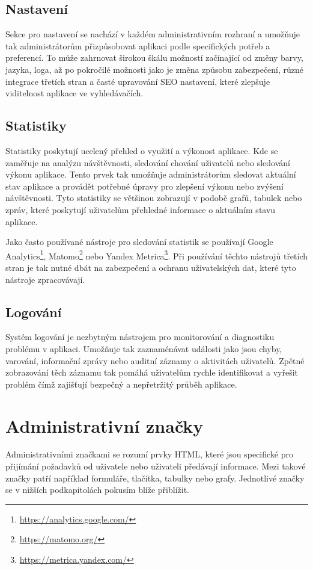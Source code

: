 \subsection{Nastavení}
\label{subsec:admin-elements-settings}
Sekce pro nastavení se nachází v každém administrativním rozhraní a umožňuje tak administrátorům přizpůsobovat aplikaci podle specifických potřeb a preferencí. To může zahrnovat širokou škálu možností začínající od změny barvy, jazyka, loga, až po pokročilé možnosti jako je změna způsobu zabezpečení, různé integrace třetích stran a časté upravování SEO nastavení, které zlepšuje viditelnost aplikace ve vyhledávačích.

\subsection{Statistiky}
\label{subsec:admin-elements-statistics}
Statistiky poskytují ucelený přehled o využití a výkonost aplikace. Kde se zaměřuje na analýzu návštěvnosti, sledování chování uživatelů nebo sledování výkonu aplikace. Tento prvek tak umožňuje administrátorům sledovat aktuální stav aplikace a provádět potřebné úpravy pro zlepšení výkonu nebo zvýšení návštěvnosti.
Tyto statistiky se většinou zobrazují v podobě grafů, tabulek nebo zpráv, které poskytují uživatelům přehledné informace o aktuálním stavu aplikace.

Jako často používané nástroje pro sledování statistik se používají Google Analytics\footnote[4]{\url{https://analytics.google.com/}}, Matomo\footnote[5]{\url{https://matomo.org/}} nebo Yandex Metrica\footnote[6]{\url{https://metrica.yandex.com/}}. Při používání těchto nástrojů třetích stran je tak nutné dbát na zabezpečení a ochranu uživatelských dat, které tyto nástroje zpracovávají.

\subsection{Logování}
\label{subsec:admin-elements-logs}
Systém logování je nezbytným nástrojem pro monitorování a diagnostiku problému v aplikaci. Umožňuje tak zaznaménávat události jako jsou chyby, varování, informační zprávy nebo auditní záznamy o aktivitách uživatelů. Zpětné zobrazování těch záznamu tak pomáhá uživatelům rychle identifikovat a vyřešit problém čímž zajišťují bezpečný a nepřetržitý průběh aplikace.

\section{Administrativní značky}
\label{sec:admin-tags}
Administrativními značkami se rozumí prvky HTML, které jsou specifické pro přijímání požadavků od uživatele nebo uživateli předávají informace. Mezi takové značky patří například formuláře, tlačítka, tabulky nebo grafy. Jednotlivé značky se v nižších podkapitolách pokusím blíže přiblížit.

